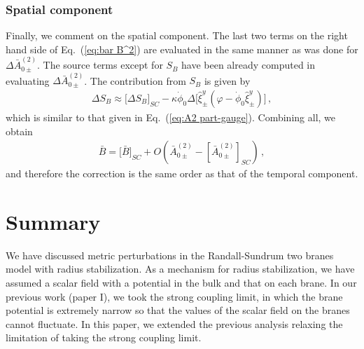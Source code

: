 \documentclass[a4paper,showpacs,preprintnumbers,amsmath,amssymb]{revtex4}
\begin{document}
\subsubsection{Spatial component}
 
Finally, we comment on the spatial component. 
The last two terms on the right hand side of Eq.~(\ref{eq:bar B^2}) are evaluated in the same manner as was done for $\Delta \bar A_{0\pm}^{(2)}$. 
The source terms except for $S_B$ have been already computed in evaluating $\Delta \bar A_{0\pm}^{(2)}$.  
The contribution from $S_B$ is given by 
\begin{eqnarray}
\Delta S_B\approx \bigl[ \Delta S_B \bigr]_{SC}
- \kappa \dot\phi_0 \Delta \bigl[
  \hat \xi_\pm^y (\varphi - \dot \phi_0 \hat  \xi^y_\pm)
 \bigr]\,, 
\end{eqnarray}
which is similar to that given in Eq.~(\ref{eq:A2 part-gauge}). 
Combining all, we obtain
\begin{eqnarray}
  \bar B 
=
  \bigl[ \bar B \bigr]_{SC} 
+ O \left(  \bar A^{(2)}_{0 \pm} -[   \bar A^{(2)}_{0 \pm}]_{SC} 
    \right) \,,
\end{eqnarray}
and therefore the correction is the same order as that of the temporal component.

 

\section{Summary}
\label{sec:summary}


We have discussed metric perturbations in the Randall-Sundrum two branes model with radius stabilization.  As a mechanism for radius stabilization, we have assumed a scalar field with a potential in the bulk and that on each brane.  In our previous work (paper I), we took the strong coupling limit, in which the brane potential is extremely narrow so that the values of the scalar field on the branes cannot fluctuate. 
In this paper, we extended the previous analysis relaxing the limitation of taking the strong coupling limit.
\end{document}
